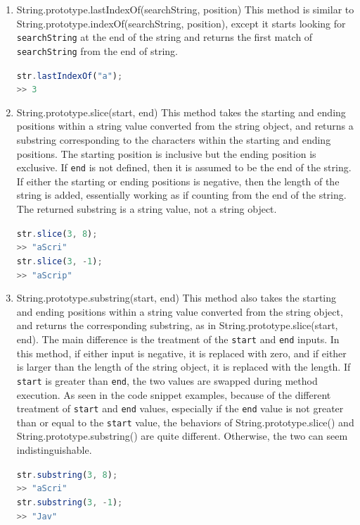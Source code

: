 \documentclass[a4paper,11pt,twoside]{report}
\def\jsinline{\lstinline[language=JavaScript, basicstyle=\small]}%\end{lstlisting}
\begin{document}
\begin{enumerate}
\item String.prototype.lastIndexOf(searchString, position) \newline
This method is similar to String.prototype.indexOf(searchString, position), except it starts looking for \jsinline|searchString| at the end of the string and returns the first match of \jsinline|searchString| from the end of string.

\jsinline|str.lastIndexOf("a");| \\
\jsinline|>> 3|

\item String.prototype.slice(start, end) \newline
This method takes the starting and ending positions within a string value converted from the string object, and returns a substring corresponding to the characters within the starting and ending positions. The starting position is inclusive but the ending position is exclusive. If \jsinline|end| is not defined, then it is assumed to be the end of the string. If either the starting or ending positions is negative, then the length of the string is added, essentially working as if counting from the end of the string. The returned substring is a string value, not a string object.

\jsinline|str.slice(3, 8);| \\
\jsinline|>> "aScri"| \\
\jsinline|str.slice(3, -1);| \\
\jsinline|>> "aScrip"|

\item String.prototype.substring(start, end) \newline
This method also takes the starting and ending positions within a string value converted from the string object, and returns the corresponding substring, as in String.prototype.slice(start, end). The main difference is the treatment of the \jsinline|start| and \jsinline|end| inputs. In this method, if either input is negative, it is replaced with zero, and if either is larger than the length of the string object, it is replaced with the length. If \jsinline|start| is greater than \jsinline|end|, the two values are swapped during method execution. As seen in the code snippet examples, because of the different treatment of \jsinline|start| and \jsinline|end| values, especially if the \jsinline|end| value is not greater than or equal to the \jsinline|start| value, the behaviors of String.prototype.slice() and String.prototype.substring() are quite different. Otherwise, the two can seem indistinguishable.

\jsinline|str.substring(3, 8);| \\
\jsinline|>> "aScri"| \\
\jsinline|str.substring(3, -1);| \\
\jsinline|>> "Jav"|

\end{enumerate}
\end{document}
